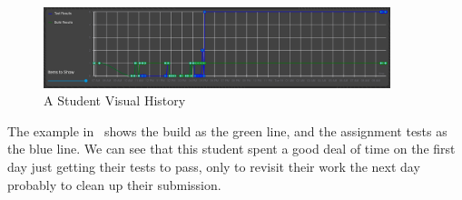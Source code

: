 \begin{figure}[ht]
    \centering
    \includegraphics[width=0.9\textwidth]{figures/student-assignment-visual-history-1}
    \caption{A Student Visual History\label{fig:student-assignment-visual-history-1}}
\end{figure}

The example in~ shows the build as the green
line, and the assignment tests as the blue line.
We can see that this student spent a good deal of time on the first day
just getting their tests to pass, only to revisit their work the next day probably to
clean up their submission.
